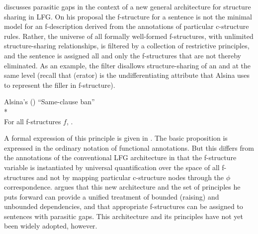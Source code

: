 \documentclass[output=paper,hidelinks]{langscibook}
\begin{document}
\citet{alsina2008} discusses parasitic gaps in the context of a new general architecture for structure sharing in LFG. On his proposal the f-structure for a sentence is not the minimal model for an f-description derived from the annotations of particular c-structure rules.  Rather, the universe of all formally well-formed f-structures, with unlimited structure-sharing relationships, is filtered by a collection of restrictive principles, and the sentence is assigned all and only the f-structures that are not thereby eliminated.   As an example, the filter  disallows structure-sharing of an  and \SUBJ at the same level (recall that (erator) is the undifferentiating attribute that Alsina uses to represent the filler in f-structure).

\ea\label{alsina}Alsina's (\citeyear{alsina2008})  ``Same-clause  ban''\\*
\ea\label{alsina1}{\large *}\ \\
\ex\label{alsina2}For all f-structures $f$, .
\z\z


\largerpage
\noindent  A formal expression of this principle is given in . The basic proposition is expressed in the ordinary notation of functional annotations.  But this differs from the annotations of the conventional LFG architecture in that the f-structure variable is instantiated by universal quantification over the space of all f-structures and not by mapping particular c-structure nodes through the $\phi$ correspondence.  \citet{alsina2008} argues that this new architecture and the set of principles he puts forward can provide a unified treatment of bounded (raising) and unbounded dependencies, and that appropriate f-structures can be assigned to sentences with parasitic gaps.  This architecture and its principles have not yet been widely adopted, however.
\end{document}
